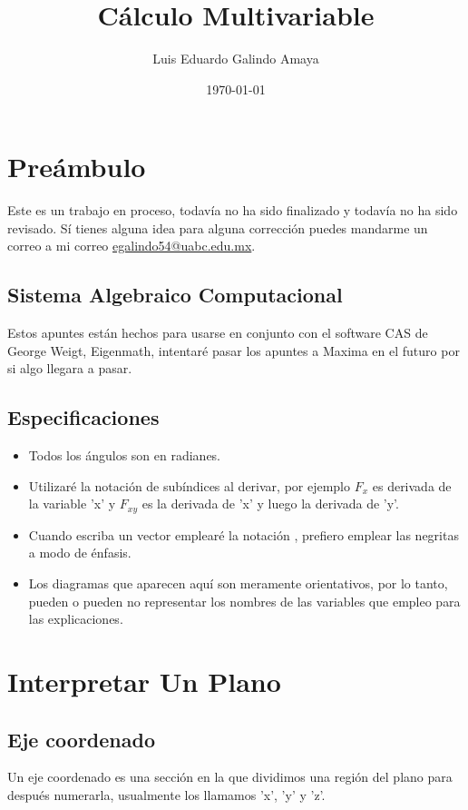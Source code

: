 \documentclass{article}
\author{Luis Eduardo Galindo Amaya}
\date{\today}
\title{Cálculo Multivariable}
\begin{document}
\maketitle
\tableofcontents

\pagebreak

\section{Preámbulo}
\label{sec:orgf98f68b}
Este es un trabajo en proceso, todavía no ha sido finalizado y todavía no ha sido revisado. Sí tienes alguna idea para alguna corrección puedes mandarme un correo a mi correo \href{mailto:egalindo54@uabc.edu.mx}{egalindo54@uabc.edu.mx}.

\subsection{Sistema Algebraico Computacional}
\label{sec:org2ad999c}
Estos apuntes están hechos para usarse en conjunto con el software CAS de George Weigt, Eigenmath, intentaré pasar los apuntes a Maxima en el futuro por si algo llegara a pasar.

\subsection{Especificaciones}
\label{sec:org17e0b9a}
\begin{itemize}
\item Todos los ángulos son en radianes.
\item Utilizaré la notación de subíndices al derivar, por ejemplo \(F_x\) es derivada de la variable 'x' y \(F_{xy}\) es la derivada de 'x' y luego la derivada de 'y'.
\item Cuando escriba un vector emplearé la notación , prefiero emplear las negritas a modo de énfasis.
\item Los diagramas que aparecen aquí son meramente orientativos, por lo tanto, pueden o pueden no representar los nombres de las variables que empleo para las explicaciones.
\end{itemize}

\section{Interpretar Un Plano}
\label{sec:orgc221038}
\subsection{Eje coordenado}
\label{sec:orgfd9c803}
Un eje coordenado es una sección en la que dividimos una región del plano para después numerarla, usualmente los llamamos 'x', 'y' y 'z'.
\end{document}
